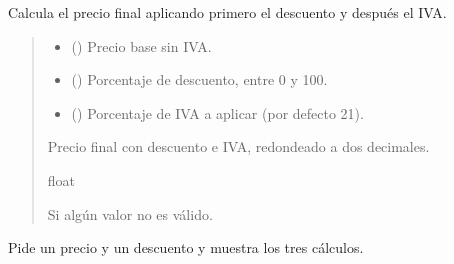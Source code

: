 \documentclass[letterpaper,10pt,spanish]{sphinxmanual}
\begin{document}
\begin{fulllineitems}
\label{\detokenize{calculadora:calculadora.calcular_precio_final}}
\pysigstartsignatures
\pysiglinewithargsret
{}
{\sphinxparamcomma {}\sphinxparamcomma {}}
{}
\pysigstopsignatures
\sphinxAtStartPar
Calcula el precio final aplicando primero el descuento y después el IVA.
\begin{quote}\begin{description}
\begin{itemize}
\item {} 
\sphinxAtStartPar
{} () \textendash{} Precio base sin IVA.

\item {} 
\sphinxAtStartPar
{} () \textendash{} Porcentaje de descuento, entre 0 y 100.

\item {} 
\sphinxAtStartPar
{} () \textendash{} Porcentaje de IVA a aplicar (por defecto 21).

\end{itemize}

\sphinxAtStartPar
Precio final con descuento e IVA, redondeado a dos decimales.

\sphinxAtStartPar
float

\sphinxAtStartPar
{} \textendash{} Si algún valor no es válido.

\end{description}\end{quote}

\end{fulllineitems}


\begin{fulllineitems}
\label{\detokenize{calculadora:calculadora.main}}
\pysigstartsignatures
\pysiglinewithargsret
{}
{}
{}
\pysigstopsignatures
\sphinxAtStartPar
Pide un precio y un descuento y muestra los tres cálculos.

\end{fulllineitems}
\end{document}
